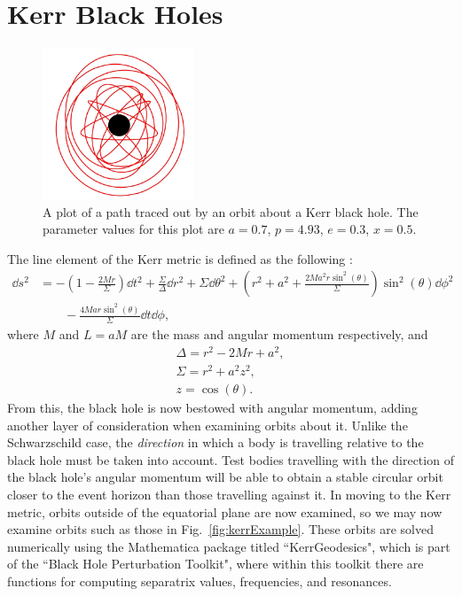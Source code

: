 
\section{Kerr Black Holes}
\begin{figure}
\centering
    \includegraphics[width=0.4\textwidth]{images/KerrOrbitExample1.pdf}
    \caption[Kerr black hole example]{A plot of a path traced out by an orbit about a Kerr black hole. The parameter values for this plot are $a=0.7$, $p=4.93$, $e=0.3$, $x=0.5$.}
    \label{fig:kerrExample}
\end{figure}
The line element of the Kerr metric is defined as the following \cite{Teukolsky_2015}:
\begin{equation}\label{eqn:kerrmetric}
\begin{split}
\dd{s}^2&=-\left(1-\frac{2Mr}{\Sigma} \right)\dd{t}^2 + \frac{\Sigma}{\Delta}\dd{r}^2 +\Sigma\dd{\theta}^2+\left(r^2+a^2+\frac{2Ma^2r\sin^2(\theta)}{\Sigma}\right)\sin^2(\theta)\dd{\phi}^2\\
 &\qquad- \frac{4Mar\sin^2(\theta)}{\Sigma}\dd{t}\dd{\phi},
\end{split}
\end{equation}
where $M$ and $L=aM$ are the mass and angular momentum respectively, and
\begin{gather}
	\Delta=r^2-2Mr+a^2,\\
    \Sigma=r^2+a^2z^2,\\
    z=\cos(\theta).
\end{gather}
From this, the black hole is now bestowed with angular momentum, adding another layer of consideration when examining orbits about it.
Unlike the Schwarzschild case, the \textit{direction} in which a body is travelling relative to the black hole must be taken into account.
Test bodies travelling with the direction of the black hole's angular momentum will be able to obtain a stable circular orbit closer to the event horizon than those travelling against it.
In moving to the Kerr metric, orbits outside of the equatorial plane are now examined, so we may now examine orbits such as those in Fig.~\eqref{fig:kerrExample}.
These orbits are solved numerically using the Mathematica package titled ``KerrGeodesics", which is part of the ``Black Hole Perturbation Toolkit", where within this toolkit there are functions for computing separatrix values, frequencies, and resonances.

